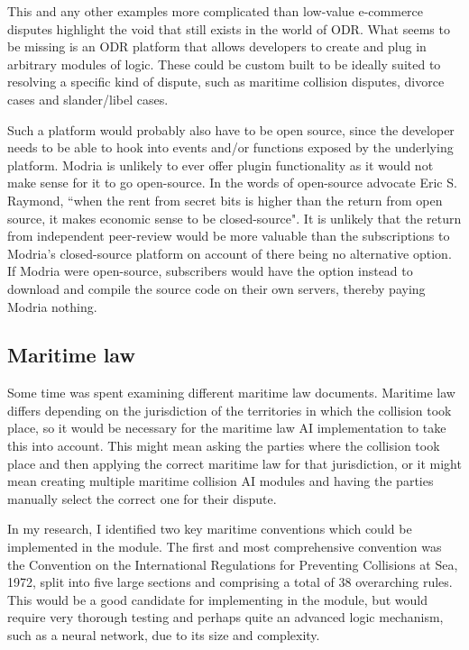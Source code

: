 This and any other examples more complicated than low-value e-commerce disputes highlight the void that still exists in the world of ODR. What seems to be missing is an ODR platform that allows developers to create and plug in arbitrary modules of logic. These could be custom built to be ideally suited to resolving a specific kind of dispute, such as maritime collision disputes, divorce cases and slander/libel cases.

Such a platform would probably also have to be open source, since the developer needs to be able to hook into events and/or functions exposed by the underlying platform. Modria is unlikely to ever offer plugin functionality as it would not make sense for it to go open-source. In the words of open-source advocate Eric S. Raymond, ``when the rent from secret bits is higher than the return from open source, it makes economic sense to be closed-source". It is unlikely that the return from independent peer-review would be more valuable than the subscriptions to Modria's closed-source platform on account of there being no alternative option. If Modria were open-source, subscribers would have the option instead to download and compile the source code on their own servers, thereby paying Modria nothing.

\subsection{Maritime law}

Some time was spent examining different maritime law documents. Maritime law differs depending on the jurisdiction of the territories in which the collision took place, so it would be necessary for the maritime law AI implementation to take this into account. This might mean asking the parties where the collision took place and then applying the correct maritime law for that jurisdiction, or it might mean creating multiple maritime collision AI modules and having the parties manually select the correct one for their dispute.

In my research, I identified two key maritime conventions which could be implemented in the module. The first and most comprehensive convention was the Convention on the International Regulations for Preventing Collisions at Sea, 1972, split into five large sections and comprising a total of 38 overarching rules. This would be a good candidate for implementing in the module, but would require very thorough testing and perhaps quite an advanced logic mechanism, such as a neural network, due to its size and complexity. %

